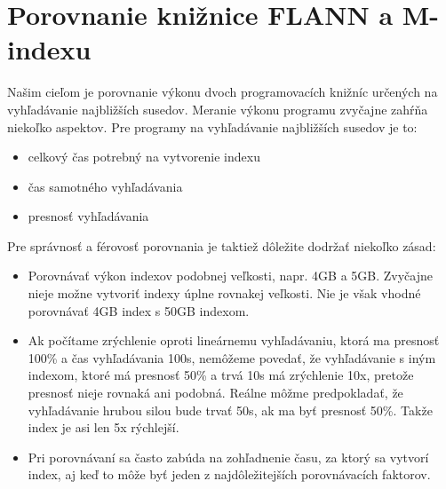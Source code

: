 \documentclass[12pt,a4paper,oneside]{fithesis2}
\begin{document}
    \chapter{Porovnanie knižnice FLANN a M-indexu}
    Našim cieľom je porovnanie výkonu dvoch programovacích knižníc určených na vyhľadávanie najbližších susedov. Meranie výkonu programu zvyčajne zahŕňa niekoľko aspektov. Pre programy na vyhľadávanie najbližších susedov je to:
    \begin{itemize}
    \item celkový čas potrebný na vytvorenie indexu
    \item čas samotného vyhľadávania
    \item presnosť vyhľadávania
\end{itemize}   
Pre správnosť a férovosť porovnania je taktiež dôležite dodržať niekoľko zásad:
\begin{itemize}
\item Porovnávať výkon indexov podobnej veľkosti, napr. 4GB a 5GB. Zvyčajne nieje možne vytvoriť indexy úplne rovnakej veľkosti. Nie je však vhodné porovnávať 4GB index s 50GB indexom.

\item Ak počítame zrýchlenie oproti lineárnemu vyhľadávaniu, ktorá ma presnosť 100\% a čas vyhľadávania 100s, nemôžeme povedať, že vyhľadávanie s iným indexom, ktoré má presnosť 50\% a trvá 10s má zrýchlenie 10x, pretože presnosť nieje rovnaká ani podobná. Reálne môžme predpokladať, že vyhľadávanie hrubou silou bude trvať 50s, ak ma byť presnosť 50\%. Takže index je asi len 5x rýchlejší.

\item Pri porovnávaní sa často zabúda na zohľadnenie času, za ktorý sa vytvorí index, aj keď to môže byť jeden z najdôležitejších porovnávacích faktorov.
\end{itemize}
  
\end{document}
